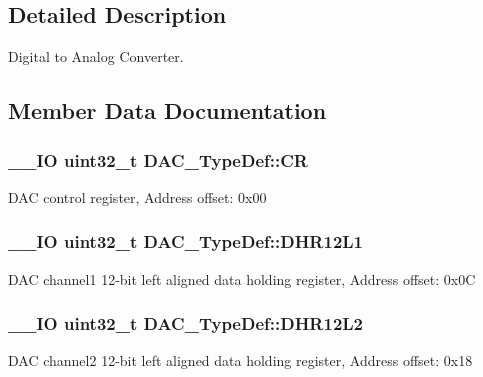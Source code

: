 \subsection{Detailed Description}
Digital to Analog Converter. 

\subsection{Member Data Documentation}
\hypertarget{struct_d_a_c___type_def_a394324f0b573837ca15a87127b2a37ea}{}
\subsubsection[{C\+R}]{\setlength{\rightskip}{0pt plus 5cm}\+\_\+\+\_\+\+I\+O uint32\+\_\+t D\+A\+C\+\_\+\+Type\+Def\+::\+C\+R}\label{struct_d_a_c___type_def_a394324f0b573837ca15a87127b2a37ea}
D\+A\+C control register, Address offset\+: 0x00 \hypertarget{struct_d_a_c___type_def_a5eb63912e39085e3e13d64bdb0cf38bd}{}
\subsubsection[{D\+H\+R12\+L1}]{\setlength{\rightskip}{0pt plus 5cm}\+\_\+\+\_\+\+I\+O uint32\+\_\+t D\+A\+C\+\_\+\+Type\+Def\+::\+D\+H\+R12\+L1}\label{struct_d_a_c___type_def_a5eb63912e39085e3e13d64bdb0cf38bd}
D\+A\+C channel1 12-\/bit left aligned data holding register, Address offset\+: 0x0\+C \hypertarget{struct_d_a_c___type_def_a9f612b6b3e065e810e5a2fb254d6a40b}{}
\subsubsection[{D\+H\+R12\+L2}]{\setlength{\rightskip}{0pt plus 5cm}\+\_\+\+\_\+\+I\+O uint32\+\_\+t D\+A\+C\+\_\+\+Type\+Def\+::\+D\+H\+R12\+L2}\label{struct_d_a_c___type_def_a9f612b6b3e065e810e5a2fb254d6a40b}
D\+A\+C channel2 12-\/bit left aligned data holding register, Address offset\+: 0x18 \hypertarget{struct_d_a_c___type_def_aea4d055e3697999b44cdcf2702d79d40}{}

